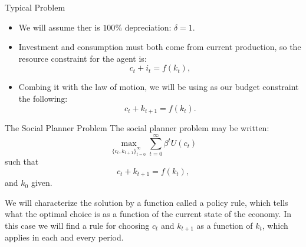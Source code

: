 \documentclass{beamer}
\begin{document}
\begin{frame}{Typical Problem }
\begin{itemize}
    \item We will assume ther is $100\%$ depreciation: $\delta=1$.
    \item Investment and consumption must both come from current production, so the resource constraint for the agent is: 
    \[c_t+i_t=f(k_t), 
    \]
    \item Combing it with the law of motion, we will be using as our budget constraint the following:
    \[c_t+k_{t+1}=f(k_t).
    \]
\end{itemize}
\end{frame}
\begin{frame}{The Social Planner Problem}
    The social planner problem may be written:
    \[\max_{\{c_t, k_{t+1}\}_{t=0}^\infty} \sum_{t=0}^\infty \beta^t U(c_t)
    \]
    such that 
     \[c_t+k_{t+1}=f(k_t),
    \]
    and $k_0$ given.
    \par We will characterize the solution by a function called a policy rule, which tells what the optimal choice is as a function of the current state of the economy. In this case we will find a rule for choosing $c_t$ and $k_{t+1}$ as a function of $k_t$, which applies in each and every period. 
\end{frame}
\end{document}

